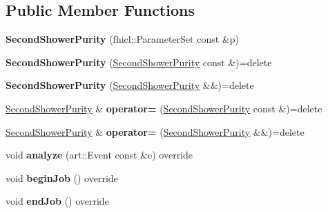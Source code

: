 \subsection*{Public Member Functions}
\begin{DoxyCompactItemize}
\item 
\hypertarget{classSecondShowerPurity_a71eca6026bbad15c88a48b34137c3c9a}{{\bfseries Second\-Shower\-Purity} (fhicl\-::\-Parameter\-Set const \&p)}\label{classSecondShowerPurity_a71eca6026bbad15c88a48b34137c3c9a}

\item 
\hypertarget{classSecondShowerPurity_ac179e01d4ca5cc86bdbe60a96b7c77f6}{{\bfseries Second\-Shower\-Purity} (\hyperlink{classSecondShowerPurity}{Second\-Shower\-Purity} const \&)=delete}\label{classSecondShowerPurity_ac179e01d4ca5cc86bdbe60a96b7c77f6}

\item 
\hypertarget{classSecondShowerPurity_a84a772f635474b23f01ff0a9310a17ec}{{\bfseries Second\-Shower\-Purity} (\hyperlink{classSecondShowerPurity}{Second\-Shower\-Purity} \&\&)=delete}\label{classSecondShowerPurity_a84a772f635474b23f01ff0a9310a17ec}

\item 
\hypertarget{classSecondShowerPurity_a4eb7919d85a8756fe432dddd9061ea85}{\hyperlink{classSecondShowerPurity}{Second\-Shower\-Purity} \& {\bfseries operator=} (\hyperlink{classSecondShowerPurity}{Second\-Shower\-Purity} const \&)=delete}\label{classSecondShowerPurity_a4eb7919d85a8756fe432dddd9061ea85}

\item 
\hypertarget{classSecondShowerPurity_a6235a3f18b7a78b19a05047c644e31e4}{\hyperlink{classSecondShowerPurity}{Second\-Shower\-Purity} \& {\bfseries operator=} (\hyperlink{classSecondShowerPurity}{Second\-Shower\-Purity} \&\&)=delete}\label{classSecondShowerPurity_a6235a3f18b7a78b19a05047c644e31e4}

\item 
\hypertarget{classSecondShowerPurity_a3850d9497262ed256e5a7476d3982725}{void {\bfseries analyze} (art\-::\-Event const \&e) override}\label{classSecondShowerPurity_a3850d9497262ed256e5a7476d3982725}

\item 
\hypertarget{classSecondShowerPurity_a452d497e9edfaa2576a3b5a0540a22a8}{void {\bfseries begin\-Job} () override}\label{classSecondShowerPurity_a452d497e9edfaa2576a3b5a0540a22a8}

\item 
\hypertarget{classSecondShowerPurity_abf54dcc8e9113033b779484072ae1780}{void {\bfseries end\-Job} () override}\label{classSecondShowerPurity_abf54dcc8e9113033b779484072ae1780}

\end{DoxyCompactItemize}

